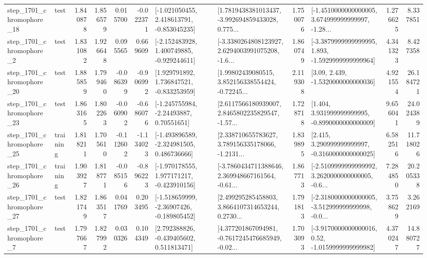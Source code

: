 \begin{tabular}{llrrrrllrlrr}
 step\_1701\_chromophore\_18 &      test &      1.840878 &    1.856579 &      0.015700 & -0.022371 &   [-1.021050455, 2.418613791, -0.853045235] &  [1.7819438381013437, -3.992694859433028, 0.775... &       1.750076 &  [-1.4510000000000005, 3.674999999999997, -1.28... &            1.276625 &          8.337851 \\
  step\_1701\_chromophore\_2 &      test &      1.831082 &    1.926648 &      0.095565 &  0.669609 &   [-2.152483928, 1.400749885, -0.929244611] &  [-3.3380264808123927, 2.6294003991075208, -1.6... &       1.860749 &  [-3.3879999999999995, 1.893, -1.5929999999999964] &            4.341323 &          8.427358 \\
 step\_1701\_chromophore\_20 &      test &      1.885859 &    1.799460 &     -0.086399 & -0.906992 &    [1.929791892, 1.736847521, -0.833253959] &  [1.99802439080515, 3.852156338554424, -0.72245... &       2.119308 &                 [3.09, 2.439, -1.5320000000000036] &            4.921554 &         26.184721 \\
 step\_1701\_chromophore\_23 &      test &      1.863165 &    1.802263 &     -0.060902 & -0.686076 &     [-1.245755984, -2.24493887, 0.70551651] &  [2.6117566180939007, 2.8465802235829547, -1.57... &       1.728718 &    [1.404, 3.931999999999995, -0.8990000000000009] &            9.656041 &         24.024389 \\
 step\_1701\_chromophore\_25 &  training &      1.818211 &    1.705610 &     -0.112602 & -1.134023 &   [-1.493896589, -2.324981505, 0.486736666] &  [2.338710655783627, 3.789156335178066, -1.2131... &       1.839895 &    [2.415, 3.290999999999997, -0.3160000000000025] &            6.582516 &         11.718026 \\
 step\_1701\_chromophore\_26 &  training &      1.903927 &    1.818771 &     -0.085156 & -0.896223 &   [-1.970178555, 1.977171217, -0.423910156] &  [-3.7860434711388646, 2.369948667161564, -0.61... &       1.867713 &  [-2.5109999999999992, 3.2620000000000005, -0.6... &            7.284850 &         20.205338 \\
 step\_1701\_chromophore\_27 &      test &      1.821749 &    1.863517 &      0.041769 &  0.203495 &   [-1.518659999, -2.36907426, -0.189805452] &  [2.499295285458803, 3.8664107314653244, 0.2730... &       1.791813 &  [-2.3180000000000005, -3.512999999999998, -0.0... &            3.758629 &          3.262169 \\
  step\_1701\_chromophore\_7 &      test &      1.797667 &    1.827992 &      0.030326 &  0.104349 &    [2.792388826, -0.439405602, 0.511813471] &  [4.377201867094981, -0.7617245476685949, -0.02... &       1.703093 &   [-3.9170000000000016, 0.52, -1.0159999999999982] &            4.370247 &         14.880727 \\

\end{tabular}
